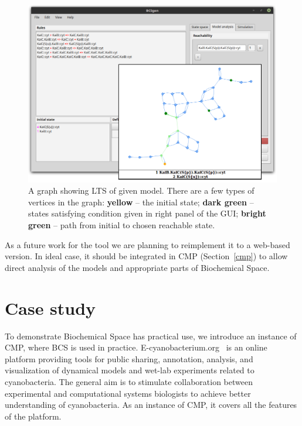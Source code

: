 \documentclass[12pt]{fithesis2}
\begin{document}
\begin{figure}[!h]
\begin{center}
\includegraphics[scale=0.3]{pics/BCSgen_reach}
\caption{A graph showing LTS of given model. There are a few types of vertices in the graph: \textbf{yellow} -- the initial state; \textbf{dark green} -- states satisfying condition given in right panel of the GUI; \textbf{bright green} -- path from initial to chosen reachable state.}\label{gui_reach}
\end{center}
\end{figure}

As a future work for the tool we are planning to reimplement it to a web-based version. In ideal case, it should be integrated in CMP (Section~\ref{cmp}) to allow direct analysis of the models and appropriate parts of Biochemical Space.  

\chapter{Case study}
\label{case_study}

To demonstrate Biochemical Space has practical use, we introduce an instance of CMP, where BCS is used in practice. E-cyanobacterium.org~\cite{Trojak2016} is an online platform providing tools for public sharing, annotation, analysis, and visualization of dynamical models and wet-lab experiments related to cyanobacteria. The general aim is to stimulate collaboration between experimental and computational systems biologists to achieve better understanding of cyanobacteria. As an instance of CMP, it covers all the features of the platform.
\end{document}
